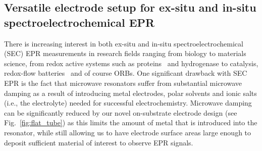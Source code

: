 \subsection{Versatile electrode setup for ex-situ and in-situ spectroelectrochemical EPR}\label{electrode_setup}
%
There is increasing interest in both ex-situ and in-situ spectroelectrochemical (SEC) EPR measurements in research fields ranging from biology to materials science, from redox active systems such as proteins~\cite{abdiaziz2019_chemcomm} and hydrogenase to catalysis,\cite{kutin2019_catalysis, neukermans2020_chemelectrochem, bonke2021_natrev, priebe2013_angewandte, rabeah2015_angewandte} redox-flow batteries~\cite{zhao2021_jacs} and of course ORBs.\cite{huang2016_jpowersources, kanzaki2018_acsappmat} One significant drawback with SEC EPR is the fact that microwave resonators suffer from substantial microwave damping as a result of introducing metal electrodes, polar solvents and ionic salts (i.e., the electrolyte) needed for successful electrochemistry.\cite{wadhawan2007_encofelectrochem} Microwave damping can be significantly reduced by our novel on-substrate electrode design (see Fig.~\ref{fig:flat_tube}) as this limits the amount of metal that is introduced into the resonator, while still allowing us to have electrode surface areas large enough to deposit sufficient material of interest to observe EPR signals.

